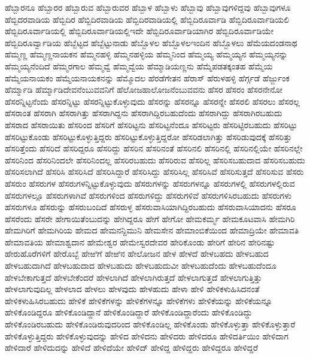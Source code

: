 {ಹೆಬ್ಬಾರನೂ
ಹೆಬ್ಬಾರರ
ಹೆಬ್ಬಾರುವ
ಹೆಬ್ಬಾರುವರ
ಹೆಬ್ಬಾಳ
ಹೆಬ್ಬಾಳು
ಹೆಬ್ಬಾವು
ಹೆಬ್ಬಾವುಗಳಿದ್ದವು
ಹೆಬ್ಬಾವುಗಳೂ
ಹೆಬ್ಬಿದರವಾಡಿಯ
ಹೆಬ್ಬಿದಿರ
ಹೆಬ್ಬಿದಿರವಾಡಿಯ
ಹೆಬ್ಬಿದಿರವಾಡಿಯಲ್ಲಿ
ಹೆಬ್ಬಿದಿರೂರ್ವಾಡಿ
ಹೆಬ್ಬಿದಿರೂರ್ವಾಡಿಯಲಿ
ಹೆಬ್ಬಿದಿರೂರ್ವಾಡಿಯಲ್ಲಿ
ಹೆಬ್ಬಿದಿರೂರ್ವಾಡಿಯಲ್ಲಿಇದೇ
ಹೆಬ್ಬಿದಿರೂರ್ವಾಡಿಯಾಗಿರ
ಹೆಬ್ಬಿದಿರೂರ್ವಾಡಿಯೇ
ಹೆಬ್ಬಿದಿರೂರ್ವ್ವಾಡಿಯ
ಹೆಬ್ಬೆಟ್ಟದ
ಹೆಬ್ಬೆಟ್ಟುನಾಡು
ಹೆಬ್ಬೊಳಲ
ಹೆಬ್ಬೊಳಲಇಂದಿನ
ಹೆಬ್ಬೊಳಲು
ಹೆಮೆಯದಂಡನಾಥ
ಹೆಮ್ಮಣ್ಣ
ಹೆಮ್ಮಣ್ಣನಾಯಕನ
ಹೆಮ್ಮನಹಳ್ಳಿ
ಹೆಮ್ಮನಹಳ್ಳಿಯ
ಹೆಮ್ಮನಿಂದ
ಹೆಮ್ಮಯ್ಯ
ಹೆಮ್ಮಯ್ಯನ
ಹೆಮ್ಮಯ್ಯನನ್ನು
ಹೆಮ್ಮಯ್ಯನೆಂದಿದೆ
ಹೆಮ್ಮರಗಾಲ
ಹೆಮ್ಮವ್ವೆ
ಹೆಮ್ಮವ್ವೆಯ
ಹೆಮ್ಮಾಡಿಯಣ್ಣನು
ಹೆಮ್ಮೆಪಡತಕ್ಕಂತಹ
ಹೆಮ್ಮೆಯ
ಹೆಮ್ಮೆಯನಾಯಕಂ
ಹೆಮ್ಮೆಯನಾಯಕನನ್ನು
ಹೆಮ್ಮೊದಲ
ಹೆರಡೆಗೇತನ
ಹೆರಾಸ್
ಹೆರುಳಹಳ್ಳಿ
ಹೆರ್ಗ್ಗಡೆ
ಹೆರ್ಜ್ಜುಂಕ
ಹೆರ್ಮ್ಮಾಡಿ
ಹೆರ್ಮ್ಮಾಡಿದೇವನೆಂಬುವವನಿಗೆ
ಹೆಲೋಜಹಾಲೋಜನೆಂಬುವವನು
ಹೆಸರ
ಹೆಸರಂ
ಹೆಸರನೇನೋ
ಹೆಸರನ್ನಿಟ್ಟನೆಂದು
ಹೆಸರನ್ನಿಟ್ಟು
ಹೆಸರನ್ನಿಟ್ಟುಕೊಳ್ಳುವುದು
ಹೆಸರನ್ನು
ಹೆಸರನ್ನೂ
ಹೆಸರನ್ನೇ
ಹೆಸರಲಿ
ಹೆಸರಲು
ಹೆಸರಲ್ಲ
ಹೆಸರಾಂತ
ಹೆಸರಾಗಿ
ಹೆಸರಾಗಿತ್ತು
ಹೆಸರಾಗಿದ್ದನು
ಹೆಸರಾಗಿದ್ದಿರಬಹುದೆಂದು
ಹೆಸರಾಗಿದ್ದು
ಹೆಸರಾಗಿರಬಹುದು
ಹೆಸರಾದ
ಹೆಸರಾಯಿತು
ಹೆಸರಿಂದ
ಹೆಸರಿಗೆ
ಹೆಸರಿಟ್ಟನು
ಹೆಸರಿಟ್ಟನೆಂದೂ
ಹೆಸರಿಟ್ಟರು
ಹೆಸರಿಟ್ಟಿರಬಹುದು
ಹೆಸರಿಟ್ಟು
ಹೆಸರಿಟ್ಟುಕೊಂಡು
ಹೆಸರಿಟ್ಟುಕೊಳ್ಳುತ್ತಿದ್ದರು
ಹೆಸರಿಟ್ಟುಕೊಳ್ಳುತ್ತಿದ್ದರೋ
ಹೆಸರಿಡಲಾಗಿತ್ತು
ಹೆಸರಿಡುವುದಕ್ಕೆ
ಹೆಸರಿತ್ತು
ಹೆಸರಿತ್ತೆಂದು
ಹೆಸರಿದೆ
ಹೆಸರಿದ್ದರೂ
ಹೆಸರಿದ್ದು
ಹೆಸರಿನ
ಹೆಸರಿನಂತೆ
ಹೆಸರಿನಲಿ
ಹೆಸರಿನಲ್ಲಿ
ಹೆಸರಿನಲ್ಲಿಯೇ
ಹೆಸರಿನಲ್ಲೇ
ಹೆಸರಿನಿಂದ
ಹೆಸರಿನಿಂದಲೇ
ಹೆಸರಿನಿಂದಲ್ಲ
ಹೆಸರಿರಬಹುದು
ಹೆಸರಿರುವ
ಹೆಸರಿಲ್ಲ
ಹೆಸರಿಸಬಹುದಾದ
ಹೆಸರಿಸಬಹುದು
ಹೆಸರಿಸಲಾಗಿದೆ
ಹೆಸರಿಸಿ
ಹೆಸರಿಸಿದೆ
ಹೆಸರಿಸಿದ್ದಾರೆ
ಹೆಸರಿಸಿದ್ದು
ಹೆಸರಿಸಿಲ್ಲ
ಹೆಸರಿಸಿವೆ
ಹೆಸರಿಸುತ್ತದೆ
ಹೆಸರಿಸುವ
ಹೆಸರು
ಹೆಸರುಂ
ಹೆಸರುಗಳ
ಹೆಸರುಗಳನ್ನಿಟ್ಟುಕೊಳ್ಳುವುದು
ಹೆಸರುಗಳನ್ನು
ಹೆಸರುಗಳನ್ನೂ
ಹೆಸರುಗಳಲ್ಲಿ
ಹೆಸರುಗಳಲ್ಲಿರುವ
ಹೆಸರುಗಳಲ್ಲೂ
ಹೆಸರುಗಳಾಗಿವೆ
ಹೆಸರುಗಳಿಂದ
ಹೆಸರುಗಳಿದ್ದು
ಹೆಸರುಗಳಿವೆ
ಹೆಸರುಗಳಿಸಿರಬಹುದು
ಹೆಸರುಗಳು
ಹೆಸರುಗಳೂ
ಹೆಸರುನ್ನು
ಹೆಸರುಬಂದಿದೆ
ಹೆಸರುಳ್ಳ
ಹೆಸರುವಾಸಿಯಾಗಿದ್ದಿರಬಹುದು
ಹೆಸರುವಾಸಿಯಾದನು
ಹೆಸರೂ
ಹೆಸರೆಂದು
ಹೆಸರೇ
ಹೇಗಾಯಿತೆಂಬುದನ್ನು
ಹೇಗಿದ್ದರೂ
ಹೇಗೆ
ಹೇಗೋ
ಹೇಮಕರ್ಮ್ಮ
ಹೇಮಕೂಟವಾಸಿ
ಹೇಮಗಿರಿ
ಹೇಮಗಿರಿಗೆ
ಹೇಮಗಿರಿಯ
ಹೇಮದ
ಹೇಮನನ್ದಿಮುನಿ
ಹೇಮಸೇನ
ಹೇಮಾಂಬಿಕೆಯಿಂದ
ಹೇಮಾದ್ರಿಯೇ
ಹೇಮಾವತಿ
ಹೇಮಾವತಿಯ
ಹೇಮಾಶ್ವದಾನ
ಹೇಮೇಶ್ವರ
ಹೇಮೇಸ್ವರದೇವರ
ಹೇರಿಕೊಂಡು
ಹೇರಿಗೆ
ಹೇರಿನ
ಹೇರಿನಷ್ಟು
ಹೇರುಹೊರೆಗಳಿಗೆ
ಹೇರೊಬ್ಬೆ
ಹೇಱಿಗೆ
ಹೇಱಿನ
ಹೇಲೋಜನ
ಹೇಳ
ಹೇಳದೆ
ಹೇಳಬಹದು
ಹೇಳಬಹುದ
ಹೇಳಬಹುದಾಗಿದೆ
ಹೇಳಬಹುದಾದ
ಹೇಳಬಹುದು
ಹೇಳಬಹುದುವೀ
ಹೇಳಬಹುದೆಂದು
ಹೇಳಬಹುದೆಂದೂ
ಹೇಳಬೇಕಾಗುತ್ತದೆ
ಹೇಳಬೇಕೆಂದರೆ
ಹೇಳಲಾಗಿದೆ
ಹೇಳಲಾಗಿರುತ್ತದೆ
ಹೇಳಲಾಗುತ್ತದೆ
ಹೇಳಲಾಗುತ್ತಿತ್ತು
ಹೇಳಲಾಗುವುದಿಲ್ಲ
ಹೇಳಲಾದ
ಹೇಳಲು
ಹೇಳವುದು
ಹೇಳಹುದು
ಹೇಳಾ
ಹೇಳಿ
ಹೇಳಿಕಳುಹಿಸಿದನಂತೆ
ಹೇಳಿಕಳುಹಿಸಿರಬಹುದು
ಹೇಳಿಕೆ
ಹೇಳಿಕೆಗಳನ್ನು
ಹೇಳಿಕೆಗಳನ್ನೂ
ಹೇಳಿಕೆಗಳು
ಹೇಳಿಕೆಯನ್ನು
ಹೇಳಿಕೆಯನ್ನೂ
ಹೇಳಿಕೊಂಡಿದ್ದರೂ
ಹೇಳಿಕೊಂಡಿದ್ದಾನೆ
ಹೇಳಿಕೊಂಡಿದ್ದಾರೆ
ಹೇಳಿಕೊಂಡಿದ್ದಾರೆಂದು
ಹೇಳಿಕೊಂಡಿದ್ದು
ಹೇಳಿಕೊಂಡಿರಬಹುದು
ಹೇಳಿಕೊಂಡಿರುವುದರಿಂದ
ಹೇಳಿಕೊಂಡಿಲ್ಲ
ಹೇಳಿಕೊಂಡು
ಹೇಳಿಕೊಳ್ಳುತ್ತಾ
ಹೇಳಿಕೊಳ್ಳುತ್ತಾರೆ
ಹೇಳಿಕೊಳ್ಳುತ್ತಿದ್ದರು
ಹೇಳಿಕೊಳ್ಳುವುದನ್ನು
ಹೇಳಿದ
ಹೇಳಿದನು
ಹೇಳಿದರು
ಹೇಳಿದರೂ
ಹೇಳಿದರ್ತಿಯಿಂ
ಹೇಳಿದಾಗ
ಹೇಳಿದಾರೆ
ಹೇಳಿದುದನ್ನು
ಹೇಳಿದೆ
ಹೇಳಿದೆಯೇ
ಹೇಳಿದ್
ಹೇಳಿದ್ದ
ಹೇಳಿದ್ದರು
ಹೇಳಿದ್ದರೂ
ಹೇಳಿದ್ದರೆ
}
